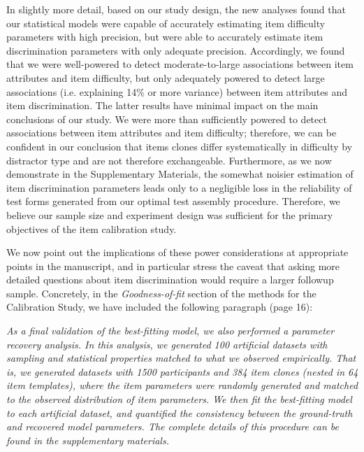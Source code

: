 \documentclass[a4paper,notitlepage,12pt]{article}
\begin{document}
In slightly more detail, based on our study design, the new analyses found that our statistical models were capable of accurately estimating item difficulty parameters with high precision, but were able to accurately estimate item discrimination parameters with only adequate precision. Accordingly, we found that we were well-powered to detect moderate-to-large associations between item attributes and item difficulty, but only adequately powered to detect large associations (i.e. explaining 14\% or more variance) between item attributes and item discrimination. The latter results have minimal impact on the main conclusions of our study. We were more than sufficiently powered to detect associations between item attributes and item difficulty; therefore, we can be confident in our conclusion that items clones differ systematically in difficulty by distractor type and are not therefore exchangeable. Furthermore, as we now demonstrate in the Supplementary Materials, the somewhat noisier estimation of item discrimination parameters leads only to a negligible loss in the reliability of test forms generated from our optimal test assembly procedure. Therefore, we believe our sample size and experiment design was sufficient for the primary objectives of the item calibration study.

We now point out the implications of these power considerations at appropriate points in the manuscript, and in particular stress the caveat that asking more detailed questions about item discrimination would require a larger followup sample. Concretely, in the \textit{Goodness-of-fit} section of the methods for the Calibration Study, we have included the following paragraph (page 16):

\begin{displayquote}
\textit{As a final validation of the best-fitting model, we also performed a parameter recovery analysis. In this analysis, we generated 100 artificial datasets with sampling and statistical properties matched to what we observed empirically. That is, we generated datasets with 1500 participants and 384 item clones (nested in 64 item templates), where the item parameters were randomly generated and matched to the observed distribution of item parameters. We then fit the best-fitting model to each artificial dataset, and quantified the consistency between the ground-truth and recovered model parameters. The complete details of this procedure can be found in the supplementary materials.} 
\end{displayquote}
\end{document}

